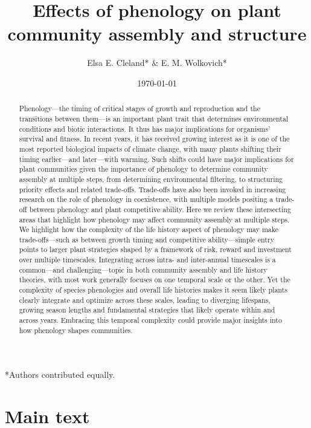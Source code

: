 \documentclass[11pt]{article}
\begin{document}
\renewcommand{\refname}{\CHead{}}

\title{Effects of phenology on plant community assembly and structure }
\author{Elsa E. Cleland* \& E. M. Wolkovich*}
\date{\today}
\maketitle


\setlength{\parindent}{0cm}
\setlength{\parskip}{5pt}
*Authors contributed equally.

\begin{abstract}
Phenology---the timing of critical stages of growth and reproduction and the transitions between them---is an important plant trait that determines environmental conditions and biotic interactions. It thus has major implications for organisms' survival and fitness. In recent years, it has received growing interest as it is one of the most reported biological impacts of climate change, with many plants shifting their timing earlier---and later---with warming. Such shifts could have major implications for plant communities given the importance of phenology to determine community assembly at multiple steps, from determining environmental filtering, to structuring priority effects and related trade-offs. Trade-offs have also been invoked in increasing research on the role of phenology in coexistence, with multiple models positing a trade-off between phenology and plant competitive ability. Here we review these intersecting areas that highlight how phenology may affect community assembly at multiple steps. We highlight how the complexity of the life history aspect of phenology may make  trade-offs---such as between growth timing and competitive ability---simple entry points to larger plant strategies shaped by a framework of risk, reward and investment over multiple timescales. Integrating across intra- and inter-annual timescales is a common---and challenging---topic in both community assembly and life history theories, with most work generally focuses on one temporal scale or the other.  Yet the complexity of species phenologies and overall life histories makes it seem likely plants clearly integrate and optimize across these scales, leading to diverging lifespans, growing season lengths and fundamental strategies that likely operate within and across years. Embracing this temporal complexity could provide major insights into how phenology shapes communities.
\end{abstract}

\section{Main text}
\end{document}
